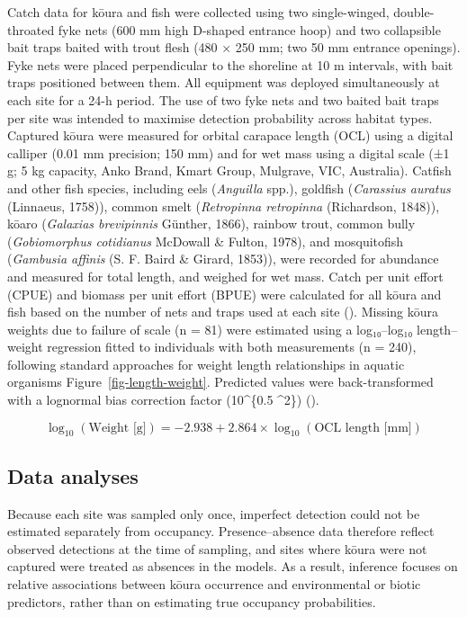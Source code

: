 \documentclass[
  letterpaper,
  DIV=11,
  numbers=noendperiod]{scrartcl}
\begin{document}
Catch data for kōura and fish were collected using two single-winged,
double-throated fyke nets (600 mm high D-shaped entrance hoop) and two
collapsible bait traps baited with trout flesh (480 × 250 mm; two 50 mm
entrance openings). Fyke nets were placed perpendicular to the shoreline
at 10 m intervals, with bait traps positioned between them. All
equipment was deployed simultaneously at each site for a 24-h period.
The use of two fyke nets and two baited bait traps per site was intended
to maximise detection probability across habitat types. Captured kōura
were measured for orbital carapace length (OCL) using a digital calliper
(0.01 mm precision; 150 mm) and for wet mass using a digital scale (±1
g; 5 kg capacity, Anko Brand, Kmart Group, Mulgrave, VIC, Australia).
Catfish and other fish species, including eels (\emph{Anguilla} spp.),
goldfish (\emph{Carassius auratus} (Linnaeus, 1758)), common smelt
(\emph{Retropinna retropinna} (Richardson, 1848)), kōaro (\emph{Galaxias
brevipinnis} Günther, 1866), rainbow trout, common bully
(\emph{Gobiomorphus cotidianus} McDowall \& Fulton, 1978), and
mosquitofish (\emph{Gambusia affinis} (S. F. Baird \& Girard, 1853)),
were recorded for abundance and measured for total length, and weighed
for wet mass. Catch per unit effort (CPUE) and biomass per unit effort
(BPUE) were calculated for all kōura and fish based on the number of
nets and traps used at each site (). Missing kōura weights due to failure of scale (n = 81)
were estimated using a log₁₀--log₁₀ length--weight regression fitted to
individuals with both measurements (n = 240), following standard
approaches for weight length relationships in aquatic organisms
Figure~\ref{fig-length-weight}. Predicted values were back-transformed
with a lognormal bias correction factor (10\^{}\{0.5
\cdot \sigma\^{}2\}) ().

\[
\log_{10}(\text{Weight [g]}) = -2.938 + 2.864 \times \log_{10}(\text{OCL length [mm]})
\]

\subsection{Data analyses}\label{data-analyses}

Because each site was sampled only once, imperfect detection could not
be estimated separately from occupancy. Presence--absence data therefore
reflect observed detections at the time of sampling, and sites where
kōura were not captured were treated as absences in the models. As a
result, inference focuses on relative associations between kōura
occurrence and environmental or biotic predictors, rather than on
estimating true occupancy probabilities.
\end{document}
